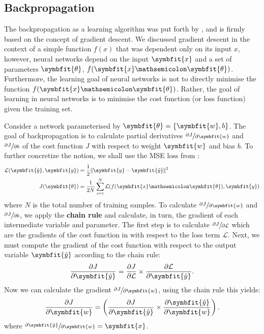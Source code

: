 \subsection{Backpropagation}\label{eqn:backprop}
The backpropagation as a learning algorithm was put forth by \textcite{rumelhart1986learning}, and is firmly based on the concept of gradient descent. We discussed gradient descent in the context of a simple function $f(x)$ that was dependent only on its input $x$, however, neural networks depend on the input $\symbfit{x}$ and a set of parameters $\symbfit{\theta}$, $f(\symbfit{x} \mathsemicolon \symbfit{\theta})$. Furthermore, the learning goal of neural networks is not to directly minimise the function $f(\symbfit{x} \mathsemicolon \symbfit{\theta})$. Rather, the goal of learning in neural networks is to minimise the cost function (or loss function) given the training set. 

Consider a network parameterised by $\symbfit{\theta} = \{\symbfit{w}, b\}$. The goal of backpropagation is to calculate partial derivatives \(\sfrac{\partial J}{\partial \symbfit{w}}\) and \(\sfrac{\partial J}{\partial b}\) of the cost function $J$ with respect to weight $\symbfit{w}$ and bias $b$. To further concretize the notion, we shall use the MSE loss from :
\begin{align}
    \mathcal{L}(\symbfit{\hat{y}}, \symbfit{y}) &= \frac{1}{2} \| \symbfit{y} - \symbfit{\hat{y}} \| ^ 2 \\
    J(\symbfit{\theta}) &= \frac{1}{2N} \sum_{i=1}^{N} \mathcal{L}(f(\symbfit{x} \mathsemicolon \symbfit{\theta}), \symbfit{y})
    \label{eqn:bp-cost-fn}
\end{align}
where $N$ is the total number of training samples. To calculate \(\sfrac{\partial J}{\partial \symbfit{w}}\) and \(\sfrac{\partial J}{\partial b}\), we apply the \textbf{chain rule} and calculate, in turn, the gradient of each intermediate variable and parameter. The first step is to calculate $\sfrac{\partial J}{\partial \mathcal{L}}$ which are the gradients of the cost function in  with respect to the loss term $\mathcal{L}$.
Next, we must compute the gradient of the cost function with respect to the output variable $\symbfit{\hat{y}}$ according to the chain rule:
\begin{equation}
    \frac{\partial J}{\partial \symbfit{\hat{y}}}
= \frac{\partial J}{\partial \mathcal{L}} \times \frac{\partial \mathcal{L}}{\partial \symbfit{\hat{y}}}.
\end{equation}
Now we can calculate the gradient \(\sfrac{\partial J}{\partial \symbfit{w}}\), using the chain rule this yields:
\begin{equation}
    \frac{\partial J}{\partial \symbfit{w}}= \left(\frac{\partial J}{\partial \symbfit{\hat{y}}} \times \frac{\partial \symbfit{\hat{y}}}{\partial \symbfit{w}}\right).
\end{equation}
where \(\sfrac{\partial \symbfit{\hat{y}}}{\partial \symbfit{w}} = \symbfit{x}\).

